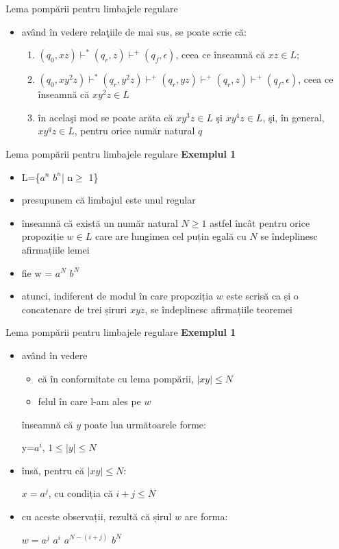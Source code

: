 \documentclass[pdf]{beamer}
\begin{document}
\begin{frame}{Lema pompării pentru limbajele regulare}
\begin{itemize}
\item
având în vedere relaţiile de mai sus, se poate scrie că:

\begin{enumerate}
\item
$ (q_0,xz) \vdash^* (q_r, z) \vdash^+ (q_f, \epsilon) $, ceea ce înseamnă că $ xz \in L $;
\item
$ (q_0,xy^{2}z) \vdash^* (q_r, y^{2}z) \vdash^+ (q_r, yz) \vdash^+ (q_r, z) \vdash^+ (q_f, \epsilon)$, ceea ce înseamnă că $ xy^{2}z \in L $
\item
în acelaşi mod se poate arăta că $ xy^{3}z \in L $ şi $ xy^{4}z \in L $, şi, în general, $ xy^{q}z \in L $, pentru orice număr natural $ q $
\end{enumerate}
\end{itemize}
\end{frame}



\begin{frame}{Lema pompării pentru limbajele regulare}
\textbf{Exemplul 1}
\begin{itemize}
\item
L=\{$a^{n}$ $b^{n}$| n$\geq$ 1\}
\item
presupunem că limbajul este unul regular
\item
înseamnă că există un număr natural $N \ge 1$ astfel încât pentru orice propoziție $w \in L$ care are lungimea cel puțin egală cu $N$ se îndeplinesc afirmațiile lemei
\item
fie w = $a^{N}$ $b^{N}$
\item
atunci, indiferent de modul în care propoziția $w$ este scrisă ca și o concatenare de trei șiruri $xyz$, se îndeplinesc afirmațiile teoremei
\end{itemize}
\end{frame}



\begin{frame}{Lema pompării pentru limbajele regulare}
\textbf{Exemplul 1}
\begin{itemize}
\item
având în vedere
\begin{itemize}
\item
că în conformitate cu lema pompării, $|xy| \le N$ 
\item
felul în care l-am ales pe $w$
\end{itemize}
înseamnă că $y$ poate lua următoarele forme:

y=$a^{i}$, $1 \leq |y| \leq N$

\item
însă, pentru că $|xy| \leq N$:

$x=a^{j}$, cu condiția că $i+j \leq N$
\item
cu aceste observații, rezultă că șirul $w$ are forma:  

$w=a^{j}$ $a^{i}$ $a^{N-(i+j)}$ $b^{N}$
\end{itemize}
\end{frame}
\end{document}
